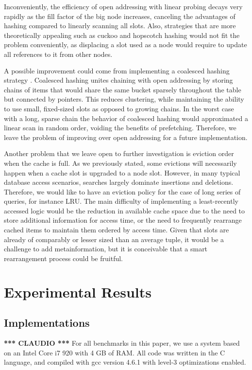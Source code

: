 \documentclass{article}
\newcommand{\claudio}{\textcolor{Cerulean}{\textbf{*** CLAUDIO ***} }}
\begin{document}
Inconveniently, the efficiency of open addressing with linear probing decays very rapidly as the fill factor
of the big node increases, canceling the advantages of hashing compared to linearly scanning all slots.
Also, strategies that are more theoretically appealing such as cuckoo and hopscotch hashing
would not fit the problem conveniently, as displacing a slot used as a node would require to update all references
to it from other nodes.

A possible improvement could come from implementing a coalesced hashing strategy \citep{Vitter:1987}.
Coalesced hashing unites chaining with open addressing by storing chains of items that would
share the same bucket sparsely throughout the table but connected by pointers.
This reduces clustering, while maintaining the ability to use small, fixed-sized slots as opposed to growing chains.
In the worst case with a long, sparse chain the behavior of coalesced hashing would approximated a linear
scan in random order, voiding the benefits of prefetching.
Therefore, we leave the problem of improving over open addressing for a future implementation.

Another problem that we leave open to further investigation is eviction order when the cache is full.
As we previously stated, some evictions will necessarily happen when a cache slot is upgraded to a node slot.
However, in many typical database access scenarios, searches largely dominate insertions and deletions.
Therefore, we would like to have an eviction policy for the case of long series of queries, for instance LRU.
The main difficulty of implementing a least-recently accessed logic would be the reduction
in available cache space due to the need to store additional information for access time,
or the need to frequently rearrange cached items to maintain them ordered by access time.
Given that slots are already of comparably or lesser sized than an average tuple, it would be a challenge
to add metainformation, but it is conceivable that a smart rearrangement process could be fruitful.

\section{Experimental Results}

\subsection{Implementations}
\claudio
For all benchmarks in this paper, we use a system based on an Intel Core i7 920 with 4 GB of RAM.
All code was written in the C language, and compiled with gcc version 4.6.1 with level-3 optimizations enabled.
\end{document}
